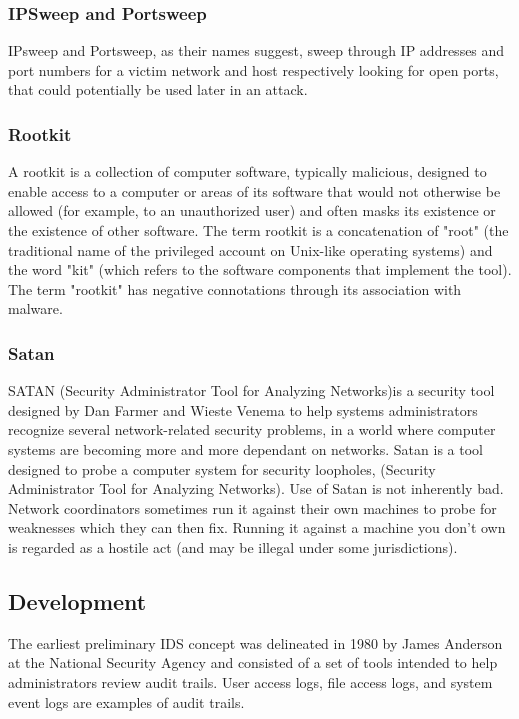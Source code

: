 \documentclass[12pt]{article}
\theoremstyle{definition}
\begin{document}
			\subsubsection{IPSweep and Portsweep}
			IPsweep  and  Portsweep,  as  their  names  suggest, sweep through IP addresses and port numbers for a  victim  network  and  host  respectively looking for open ports, that could  potentially be used later in an attack.
			
			\subsubsection{Rootkit}
			A rootkit is a collection of computer software, typically malicious, designed to enable access to a computer or areas of its software that would not otherwise be allowed (for example, to an unauthorized user) and often masks its existence or the existence of other software. The term rootkit is a concatenation of "root" (the traditional name of the privileged account on Unix-like operating systems) and the word "kit" (which refers to the software components that implement the tool). The term "rootkit" has negative connotations through its association with malware.
			
			\subsubsection{Satan}
			SATAN (Security Administrator Tool for Analyzing Networks)is a security tool designed by Dan Farmer and Wieste Venema to help systems administrators recognize several network-related security problems, in a world where computer systems are becoming more and more dependant on networks. Satan is a tool designed to probe a computer system for security loopholes, (Security Administrator Tool for Analyzing Networks). Use of Satan is not inherently bad. Network coordinators sometimes run it against their own machines to probe for weaknesses which they can then fix. Running it against a machine you don't own is regarded as a hostile act (and may be illegal under some jurisdictions).
			
		
		\subsection{Development}
		The earliest preliminary IDS concept was delineated in 1980 by James Anderson at the National Security Agency and consisted of a set of tools intended to help administrators review audit trails. User access logs, file access logs, and system event logs are examples of audit trails.
		
\end{document}
